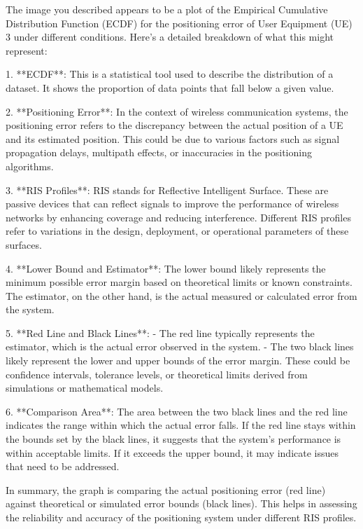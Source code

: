 The image you described appears to be a plot of the Empirical Cumulative Distribution Function (ECDF) for the positioning error of User Equipment (UE) 3 under different conditions. Here's a detailed breakdown of what this might represent:

1. **ECDF**: This is a statistical tool used to describe the distribution of a dataset. It shows the proportion of data points that fall below a given value.

2. **Positioning Error**: In the context of wireless communication systems, the positioning error refers to the discrepancy between the actual position of a UE and its estimated position. This could be due to various factors such as signal propagation delays, multipath effects, or inaccuracies in the positioning algorithms.

3. **RIS Profiles**: RIS stands for Reflective Intelligent Surface. These are passive devices that can reflect signals to improve the performance of wireless networks by enhancing coverage and reducing interference. Different RIS profiles refer to variations in the design, deployment, or operational parameters of these surfaces.

4. **Lower Bound and Estimator**: The lower bound likely represents the minimum possible error margin based on theoretical limits or known constraints. The estimator, on the other hand, is the actual measured or calculated error from the system.

5. **Red Line and Black Lines**: 
   - The red line typically represents the estimator, which is the actual error observed in the system.
   - The two black lines likely represent the lower and upper bounds of the error margin. These could be confidence intervals, tolerance levels, or theoretical limits derived from simulations or mathematical models.

6. **Comparison Area**: The area between the two black lines and the red line indicates the range within which the actual error falls. If the red line stays within the bounds set by the black lines, it suggests that the system's performance is within acceptable limits. If it exceeds the upper bound, it may indicate issues that need to be addressed.

In summary, the graph is comparing the actual positioning error (red line) against theoretical or simulated error bounds (black lines). This helps in assessing the reliability and accuracy of the positioning system under different RIS profiles.